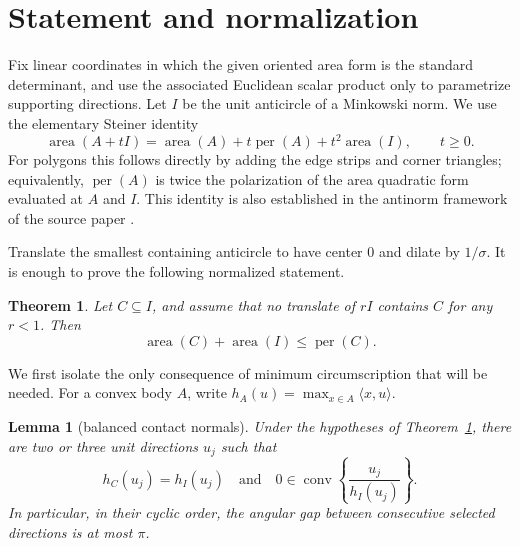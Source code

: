 \documentclass[11pt]{article}
\newtheorem{theorem}{Theorem}
\newtheorem{lemma}{Lemma}
\newcommand{\area}{\operatorname{area}}
\newcommand{\perim}{\operatorname{per}}
\newcommand{\conv}{\operatorname{conv}}
\begin{document}
\section{Statement and normalization}

Fix linear coordinates in which the given oriented area form is the standard
determinant, and use the associated Euclidean scalar product only to
parametrize supporting directions.  Let $I$ be the unit anticircle of a
Minkowski norm.  We use the elementary Steiner identity
\begin{equation}\label{eq:steiner}
 \area(A+tI)=\area(A)+t\perim(A)+t^2\area(I),\qquad t\geq0.
\end{equation}
For polygons this follows directly by adding the edge strips and corner
triangles; equivalently, $\perim(A)$ is twice the polarization of the area
quadratic form evaluated at $A$ and $I$.  This identity is also established
in the antinorm framework of the source paper \cite{MS}.

Translate the smallest containing anticircle to have center $0$ and dilate
by $1/\sigma$.  It is enough to prove the following normalized statement.

\begin{theorem}\label{thm:main}
Let $C\subseteq I$, and assume that no translate of $rI$ contains $C$ for
any $r<1$.  Then
\[
 \area(C)+\area(I)\leq\perim(C).
\]
\end{theorem}

We first isolate the only consequence of minimum circumscription that will
be needed.  For a convex body $A$, write $h_A(u)=\max_{x\in A}\langle
x,u\rangle$.

\begin{lemma}[balanced contact normals]\label{lem:contact}
Under the hypotheses of Theorem~\ref{thm:main}, there are two or three unit
directions $u_j$ such that
\[
 h_C(u_j)=h_I(u_j)
 \quad\text{and}\quad
 0\in\conv\left\{\frac{u_j}{h_I(u_j)}\right\}.
\]
In particular, in their cyclic order, the angular gap between consecutive
selected directions is at most $\pi$.
\end{lemma}
\end{document}
